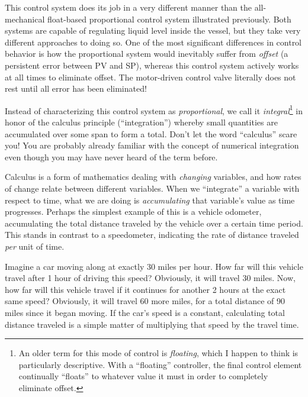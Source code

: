 This control system does its job in a very different manner than the all-mechanical float-based proportional control system illustrated previously.  Both systems are capable of regulating liquid level inside the vessel, but they take very different approaches to doing so.  One of the most significant differences in control behavior is how the proportional system would inevitably suffer from \textit{offset} (a persistent error between PV and SP), whereas this control system actively works at all times to eliminate offset.  The motor-driven control valve literally does not rest until all error has been eliminated!

\vskip 10pt

\filbreak

Instead of characterizing this control system as \textit{proportional}, we call it \textit{integral}\footnote{An older term for this mode of control is \textit{floating}, which I happen to think is particularly descriptive.  With a ``floating'' controller, the final control element continually ``floats'' to whatever value it must in order to completely eliminate offset.} in honor of the calculus principle (``integration'') whereby small quantities are accumulated over some span to form a total.  Don't let the word ``calculus'' scare you!  You are probably already familiar with the concept of numerical integration even though you may have never heard of the term before.     

Calculus is a form of mathematics dealing with \textit{changing} variables, and how rates of change relate between different variables.  When we ``integrate'' a variable with respect to time, what we are doing is \textit{accumulating} that variable's value as time progresses.  Perhaps the simplest example of this is a vehicle odometer, accumulating the total distance traveled by the vehicle over a certain time period.  This stands in contrast to a speedometer, indicating the rate of distance traveled \textit{per} unit of time.

Imagine a car moving along at exactly 30 miles per hour.  How far will this vehicle travel after 1 hour of driving this speed?  Obviously, it will travel 30 miles.  Now, how far will this vehicle travel if it continues for another 2 hours at the exact same speed?  Obviously, it will travel 60 more miles, for a total distance of 90 miles since it began moving.  If the car's speed is a constant, calculating total distance traveled is a simple matter of multiplying that speed by the travel time.

